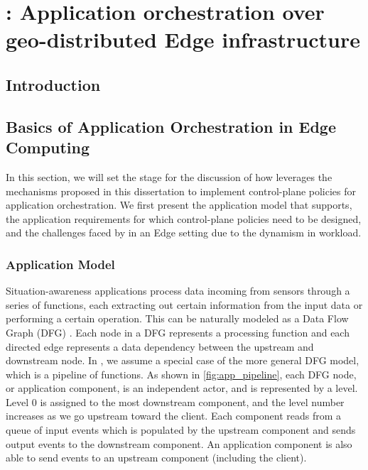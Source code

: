 \chapter{\oneedge{}: Application orchestration over geo-distributed Edge infrastructure}
\label{sec:oneedge}

\section{Introduction}

\section{Basics of Application Orchestration in Edge Computing}

In this section, we will set the stage for the discussion of how \oneedge{} leverages the mechanisms proposed in this dissertation to implement control-plane policies for application orchestration. We first present the application model that \oneedge{} supports, the application requirements for which control-plane policies need to be designed, and the challenges faced by in an Edge setting due to the dynamism in workload.

\subsection{Application Model}
\label{sec:oneedge_app_model}
Situation-awareness applications process data incoming from sensors through a series of functions, each extracting out certain information from the input data or performing a certain operation. This can be naturally modeled as a Data Flow Graph (DFG) \cite{dfg}. Each node in a DFG represents a processing function and each directed edge represents a data dependency between the upstream and downstream node. In \oneedge{}, we assume a special case of the more general DFG model, which is a pipeline of functions. As shown in \cref{fig:app_pipeline}, each DFG node, or application component, is an independent actor, and is represented by a level. Level 0 is assigned to the most downstream component, and the level number increases as we go upstream toward the client. Each component reads from a queue of input events which is populated by the upstream component and sends output events to the downstream component. An application component is also able to send events to an upstream component (including the client).

